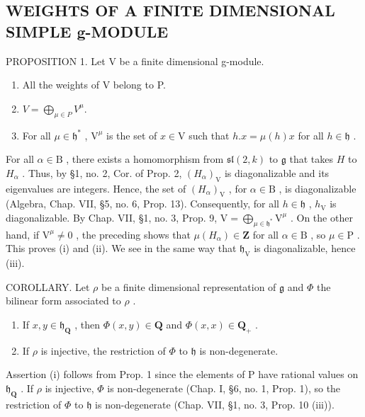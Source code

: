 \subsection{WEIGHTS OF A FINITE DIMENSIONAL SIMPLE g-MODULE}

PROPOSITION 1. Let V be a finite dimensional g-module.

\begin{enumerate}
\def\labelenumi{(\roman{enumi})}
\item
  All the weights of V belong to P.
\item
  \(V = \bigoplus_{\mu \in P} V^{\mu}.\)
\item
  For all \(\mu \in \mathfrak{h}^*\) , \(\mathrm{V}^{\mu}\) is the set of \(x \in \mathrm{V}\) such that \(h.x = \mu(h)x\) for all \(h \in \mathfrak{h}\) .
\end{enumerate}

For all \(\alpha \in \mathrm{B}\) , there exists a homomorphism from \(\mathfrak{sl}(2,k)\) to \(\mathfrak{g}\) that takes \(H\) to \(H_{\alpha}\) . Thus, by §1, no. 2, Cor. of Prop. 2, \((H_{\alpha})_{\mathrm{V}}\) is diagonalizable and its eigenvalues are integers. Hence, the set of \((H_{\alpha})_{\mathrm{V}}\) , for \(\alpha \in \mathrm{B}\) , is diagonalizable (Algebra, Chap. VII, §5, no. 6, Prop. 13). Consequently, for all \(h \in \mathfrak{h}\) , \(h_{\mathrm{V}}\) is diagonalizable. By Chap. VII, §1, no. 3, Prop. 9, \(\mathrm{V} = \bigoplus_{\mu \in \mathfrak{h}^*} \mathrm{V}^{\mu}\) . On the other hand, if \(\mathrm{V}^{\mu} \neq 0\) , the preceding shows that \(\mu(H_{\alpha}) \in \mathbf{Z}\) for all \(\alpha \in \mathrm{B}\) , so \(\mu \in \mathrm{P}\) . This proves (i) and (ii). We see in the same way that \(\mathfrak{h}_{\mathrm{V}}\) is diagonalizable, hence (iii).

COROLLARY. Let \(\rho\) be a finite dimensional representation of \(\mathfrak{g}\) and \(\Phi\) the bilinear form associated to \(\rho\) .

\begin{enumerate}
\def\labelenumi{(\roman{enumi})}
\item
  If \(x, y \in \mathfrak{h}_{\mathbf{Q}}\) , then \(\Phi(x, y) \in \mathbf{Q}\) and \(\Phi(x, x) \in \mathbf{Q}_{+}\) .
\item
  If \(\rho\) is injective, the restriction of \(\Phi\) to \(\mathfrak{h}\) is non-degenerate.
\end{enumerate}

Assertion (i) follows from Prop. 1 since the elements of P have rational values on \(\mathfrak{h}_{\mathbf{Q}}\) . If \(\rho\) is injective, \(\Phi\) is non-degenerate (Chap. I, §6, no. 1, Prop. 1), so the restriction of \(\Phi\) to \(\mathfrak{h}\) is non-degenerate (Chap. VII, §1, no. 3, Prop. 10 (iii)).

